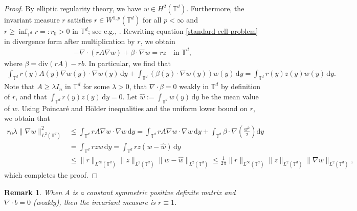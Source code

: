 \documentclass[12pt,a4paper,reqno]{amsart}
\newtheorem{remark}{Remark}[section]
\newcommand{\T}{\mathbb{T}}
\numberwithin{equation}{section}
\begin{document}
\begin{proof}
By elliptic regularity theory, we have $w\in H^2(\T^d)$. Furthermore, the invariant measure $r$ satisfies $r\in W^{1,p}(\T^d)$ for all $p<\infty$ and $r\geq \inf_{\T^d} r =: r_0>0$ in $\T^d$; see e.g., \cite{BS17,JZ23}. Rewriting equation \eqref{standard cell problem} in divergence form after multiplication by $r$, we obtain  
\begin{align*}
-\nabla\cdot (rA\nabla w)+\beta\cdot \nabla w = rz\quad\text{in }\T^d,
\end{align*}
where $\beta = \mathrm{div}(rA)-rb$. In particular, we find that
\begin{align*}
    \int_{\mathbb{T}^d}r(y)A(y)\nabla w(y) \cdot \nabla w(y)\,\mathrm{d}y + \int_{\mathbb{T}^d}(\beta(y) \cdot \nabla w(y)) w(y)\,\mathrm{d}y = \int_{\T^d} r(y)z(y)w(y) \,\mathrm{d}y.
\end{align*}
Note that $A\geq \lambda I_n$ in $\T^d$ for some $\lambda > 0$, that $\nabla\cdot \beta = 0$ weakly in $\T^d$ by definition of $r$, and that $\int_{\T^d} r(y)z(y)\, \mathrm{d}y = 0$. Let $\hat{w}:=\int_{\T^d} w(y)\, \mathrm{d}y$ be the mean value of $w$. Using Poincar\'{e} and H\"{o}lder inequalities and the uniform lower bound on $r$, we obtain that
\begin{align*}
r_0\lambda \|\nabla w\|_{L^2(\T^d)}^2 &\leq \int_{\T^d} rA\nabla w\cdot \nabla w \,\mathrm{d}y = \int_{\T^d} rA\nabla w\cdot \nabla w \,\mathrm{d}y + \int_{\T^d} \beta\cdot\nabla \left(\frac{w^2}{2}\right) \mathrm{d}y \\ &= \int_{\T^d} rzw \,\mathrm{d}y = \int_{\T^d} rz(w-\hat{w})\, \mathrm{d}y \\
&\leq \|r\|_{L^\infty(\T^d)}\|z\|_{L^2(\T^d)}\|w-\hat{w}\|_{L^2(\T^d)} \leq \frac{1}{2\pi}\|r\|_{L^\infty(\T^d)}\|z\|_{L^2(\T^d)}\|\nabla w\|_{L^2(\T^d)},
\end{align*}
which completes the proof.
\end{proof} 

\begin{remark}\label{Rk: r equals 1}
    When $A$ is a constant symmetric positive definite matrix and $\nabla\cdot b = 0$ (weakly), then the invariant measure is $r\equiv 1$.
\end{remark}
\end{document}
